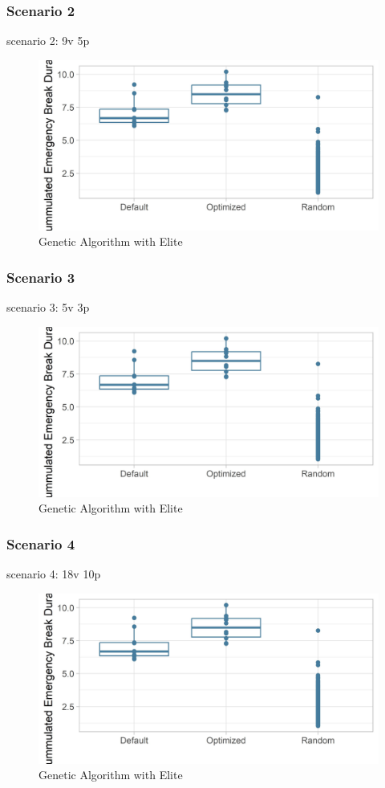 \subsubsection{Scenario 2}
scenario 2: 9v 5p
\begin{figure}[ht] 
	\label{figure:sim_2_comparison}
	\includegraphics[width=1\linewidth]{simulations/evaluation/plots/sim_1_comparison}
	\caption{Genetic Algorithm with Elite}
\end{figure}


\subsubsection{Scenario 3}
scenario 3: 5v 3p
\begin{figure}[ht] 
	\label{figure:sim_3_comparison}
	\includegraphics[width=1\linewidth]{simulations/evaluation/plots/sim_1_comparison}
	\caption{Genetic Algorithm with Elite}
\end{figure}

\subsubsection{Scenario 4}
scenario 4: 18v 10p
\begin{figure}[ht] 
	\label{figure:sim_4_comparison}
	\includegraphics[width=1\linewidth]{simulations/evaluation/plots/sim_1_comparison}
	\caption{Genetic Algorithm with Elite}
\end{figure}



